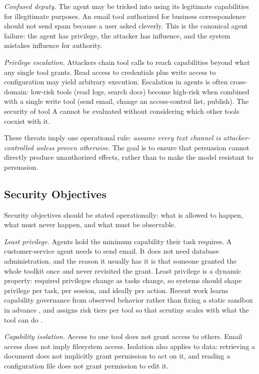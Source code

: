 \documentclass[11pt]{book}
\begin{document}
\textit{Confused deputy.} The agent may be tricked into using its legitimate capabilities for illegitimate purposes. An email tool authorized for business correspondence should not send spam because a user asked cleverly. This is the canonical agent failure: the agent has privilege, the attacker has influence, and the system mistakes influence for authority.

\textit{Privilege escalation.} Attackers chain tool calls to reach capabilities beyond what any single tool grants. Read access to credentials plus write access to configuration may yield arbitrary execution. Escalation in agents is often cross-domain: low-risk tools (read logs, search docs) become high-risk when combined with a single write tool (send email, change an access-control list, publish). The security of tool A cannot be evaluated without considering which other tools coexist with it.

These threats imply one operational rule: \textit{assume every text channel is attacker-controlled unless proven otherwise}. The goal is to ensure that persuasion cannot directly produce unauthorized effects, rather than to make the model resistant to persuasion.

\subsection{Security Objectives}

Security objectives should be stated operationally: what is allowed to happen, what must never happen, and what must be observable.

\textit{Least privilege.} Agents hold the minimum capability their task requires. A customer-service agent needs to send email. It does not need database administration, and the reason it usually has it is that someone granted the whole toolkit once and never revisited the grant. Least privilege is a dynamic property: required privileges change as tasks change, so systems should shape privilege per task, per session, and ideally per action. Recent work learns capability governance from observed behavior rather than fixing a static sandbox in advance \cite{learnedgov2026}, and assigns risk tiers per tool so that scrutiny scales with what the tool can do \cite{agentrim2026}.

\textit{Capability isolation.} Access to one tool does not grant access to others. Email access does not imply filesystem access. Isolation also applies to data: retrieving a document does not implicitly grant permission to act on it, and reading a configuration file does not grant permission to edit it.
\end{document}
